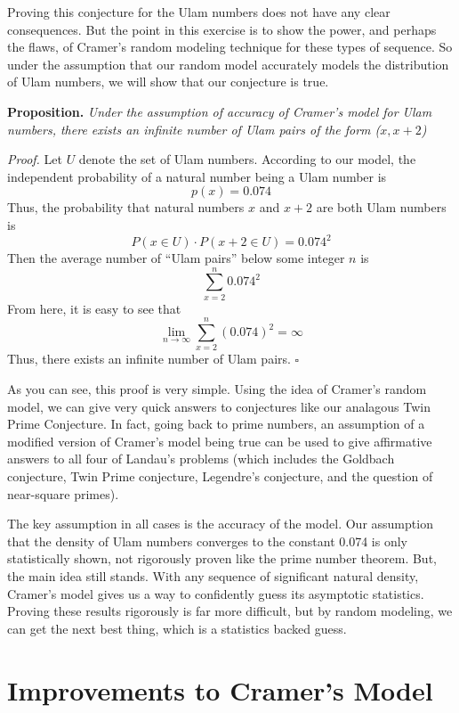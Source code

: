 \documentclass[conference]{IEEEtran}
\begin{document}
Proving this conjecture for the Ulam numbers does not have any clear consequences. But the point in this exercise is to show the power, and perhaps the flaws, of Cramer's random modeling technique for these types of sequence. So under the assumption that our random model accurately models the distribution of Ulam numbers, we will show that our conjecture is true.

\medskip\noindent
\textbf{Proposition.} \textit{Under the assumption of accuracy of Cramer's model for Ulam numbers, there exists an infinite number of Ulam pairs of the form ($x, x + 2$)} 

\smallskip\noindent
\textit{Proof.} Let $U$ denote the set of Ulam numbers. According to our model, the independent probability of a natural number being a Ulam number is
    \[p(x) = 0.074\]
Thus, the probability that natural numbers $x$ and $x + 2$ are both Ulam numbers is
    \[P(x \in U) \cdot P(x + 2 \in U) = 0.074^2\]
Then the average number of ``Ulam pairs'' below some integer $n$ is
\[\sum_{x = 2}^{n}0.074^2\]
From here, it is easy to see that
\[\lim_{n\rightarrow \infty} \sum_{x = 2}^{n}(0.074)^2 = \infty\]
Thus, there exists an infinite number of Ulam pairs.
\hfill$\square$\medskip

As you can see, this proof is very simple. Using the idea of Cramer's random model, we can give very quick answers to conjectures like our analagous Twin Prime Conjecture. In fact, going back to prime numbers, an assumption of a modified version of Cramer's model being true can be used to give affirmative answers to all four of Landau's problems (which includes the Goldbach conjecture, Twin Prime conjecture, Legendre's conjecture, and the question of near-square primes).

The key assumption in all cases is the accuracy of the model. Our assumption that the density of Ulam numbers converges to the constant 0.074 is only statistically shown, not rigorously proven like the prime number theorem. But, the main idea still stands. With any sequence of significant natural density, Cramer's model gives us a way to confidently guess its asymptotic statistics. Proving these results rigorously is far more difficult, but by random modeling, we can get the next best thing, which is a statistics backed guess. 

\section{Improvements to Cramer's Model}
\end{document}
